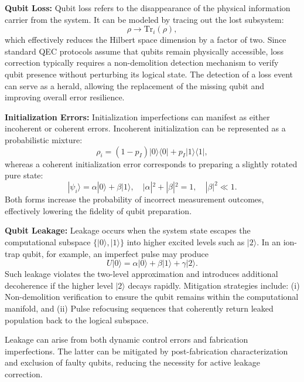 \documentclass[conference]{IEEEtran}
\begin{document}
\textbf{Qubit Loss:} Qubit loss refers to the disappearance of the physical information carrier from the system. It can be modeled by tracing out the lost subsystem:
\begin{equation}
\rho \rightarrow \mathrm{Tr}_i(\rho),
\end{equation}
which effectively reduces the Hilbert space dimension by a factor of two.  
Since standard QEC protocols assume that qubits remain physically accessible, loss correction typically requires a non-demolition detection mechanism to verify qubit presence without perturbing its logical state. The detection of a loss event can serve as a herald, allowing the replacement of the missing qubit and improving overall error resilience.

\textbf{Initialization Errors:} Initialization imperfections can manifest as either incoherent or coherent errors. Incoherent initialization can be represented as a probabilistic mixture:
\begin{equation}
\rho_i = (1-p_I)|0\rangle\langle 0| + p_I |1\rangle\langle 1|,
\end{equation}
whereas a coherent initialization error corresponds to preparing a slightly rotated pure state:
\begin{equation}
|\psi_i\rangle = \alpha|0\rangle + \beta|1\rangle, \quad |\alpha|^2 + |\beta|^2 = 1, \quad |\beta|^2 \ll 1.
\end{equation}
Both forms increase the probability of incorrect measurement outcomes, effectively lowering the fidelity of qubit preparation.

\textbf{Qubit Leakage:} Leakage occurs when the system state escapes the computational subspace $\{|0\rangle, |1\rangle\}$ into higher excited levels such as $|2\rangle$. In an ion-trap qubit, for example, an imperfect pulse may produce
\begin{equation}
U|0\rangle = \alpha|0\rangle + \beta|1\rangle + \gamma|2\rangle.
\end{equation}
Such leakage violates the two-level approximation and introduces additional decoherence if the higher level $|2\rangle$ decays rapidly.  
Mitigation strategies include:  
(i) Non-demolition verification to ensure the qubit remains within the computational manifold, and  
(ii) Pulse refocusing sequences that coherently return leaked population back to the logical subspace.  

Leakage can arise from both dynamic control errors and fabrication imperfections. The latter can be mitigated by post-fabrication characterization and exclusion of faulty qubits, reducing the necessity for active leakage correction.
\end{document}
